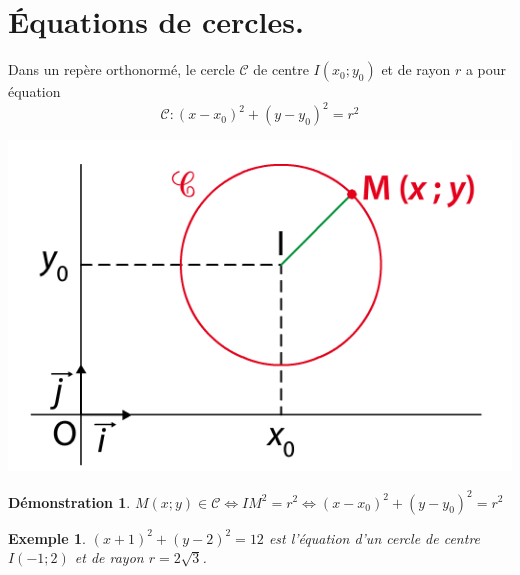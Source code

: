 \documentclass[a4paper,11pt]{article}
\theoremstyle{break}
\newcounter{enonce}
\newtheorem{exemple}[enonce]{Exemple}
\newtheorem{demonstration}[enonce]{Démonstration}
\begin{document}
\newpage

\section{\'Equations de cercles.}

\begin{theorem}
 Dans un repère orthonormé, le cercle $\mathcal{C}$ de centre $I(x_0;y_0)$ et de rayon $r$ a
 pour équation $$\mathcal{C}:(x-x_0)^2+(y-y_0)^2=r^2$$
 
      \begin{center}
    \includegraphics[scale=0.5]{../Images/cercleCentreI.png}
  \end{center}
\end{theorem}

\begin{demonstration}
 $M(x;y) \in \mathcal{C} \Leftrightarrow IM^2=r^2 \Leftrightarrow (x-x_0)^2+(y-y_0)^2=r^2$
\end{demonstration}

\begin{exemple}
 $(x+1)^2+(y-2)^2=12$ est l'équation d'un cercle de centre $I(-1;2)$ et de rayon $r=2\sqrt{3}$.
\end{exemple}
\end{document}
